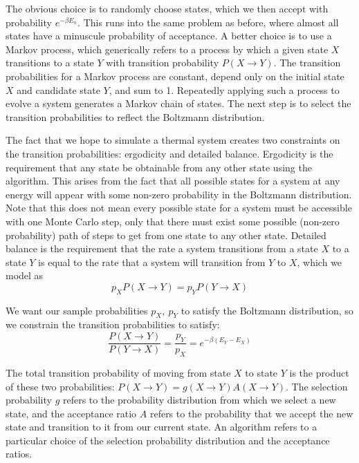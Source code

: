 \documentclass[twocolumn,aps]{revtex4-1} %
\begin{document}
The obvious choice is to randomly choose states, which we then accept with probability $e^{-\beta E_n}$. This runs into the same problem as before, where almost all states have a minuscule probability of acceptance. A better choice is to use a Markov process, which generically refers to a process by which a given state $X$ transitions to a state $Y$ with transition probability $P(X \to Y)$. The transition probabilities for a Markov process are constant, depend only on the initial state $X$ and candidate state $Y$, and sum to 1. Repeatedly applying such a process to evolve a system generates a Markov chain of states. The next step is to select the transition probabilities to reflect the Boltzmann distribution.

The fact that we hope to simulate a thermal system creates two constraints on the transition probabilities: ergodicity and detailed balance. Ergodicity is the requirement that any state be obtainable from any other state using the algorithm. This arises from the fact that all possible states for a system at any energy will appear with some non-zero probability in the Boltzmann distribution. Note that this does not mean every possible state for a system must be accessible with one Monte Carlo step, only that there must exist some possible (non-zero probability) path of steps to get from one state to any other state. Detailed balance is the requirement that the rate a system transitions from a state $X$ to a state $Y$ is equal to the rate that a system will transition from $Y$ to $X$, which we model as 
\begin{equation}
	p_XP(X \to Y) = p_YP(Y \to X)
\end{equation}

We want our sample probabilities $p_X,\ p_Y$ to satisfy the Boltzmann distribution, so we constrain the transition probabilities to satisfy:
\begin{equation}
\frac{P(X \to Y)}{P(Y \to X)} = \frac{p_Y}{p_X} = e^{-\beta(E_Y - E_X)}
\end{equation}

The total transition probability of moving from state $X$ to state $Y$ is the product of these two probabilities: $P(X \to Y) = g(X \to Y)A(X \to Y)$. The selection probability $g$ refers to the probability distribution from which we select a new state, and the acceptance ratio $A$ refers to the probability that we accept the new state and transition to it from our current state. An algorithm refers to a particular choice of the selection probability distribution and the acceptance ratios.
\end{document}
